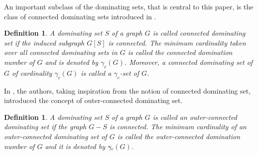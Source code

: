 \documentclass[a4paper,12pt, reqno]{amsart}
\newtheorem{Definition}[Theorem]{Definition}
\begin{document}
An important subclass of the dominating sets, that is central to this paper, is the class of connected dominating sets introduced in \cite{cds}.

\begin{Definition}
 A dominating set $S$ of a graph $G$ is called \emph{connected dominating set} if the induced subgraph $G[S]$ is connected. The minimum cardinality taken over all connected dominating sets in $G$ is called the \emph{connected domination number} of $G$ and is denoted by $\gamma_{c}(G)$. Moreover, a connected dominating set of $G$ of cardinality $\gamma_{c}(G)$ is called a $\gamma_{c}$-set of $G$.
\end{Definition}

In \cite{ocds}, the authors, taking inspiration from the notion of connected dominating set, introduced the concept of outer-connected dominating set.
\begin{Definition}
A dominating set $S$ of a graph $G$ is called an \emph{outer-connected dominating set}  if the graph $G-S$ is connected. The minimum cardinality of an outer-connected dominating set of $G$ is called the \emph{outer-connected domination number} of $G$ and it is denoted by $\gamma{\tilde{}} _{c}(G)$.%
\end{Definition}


\end{document}
